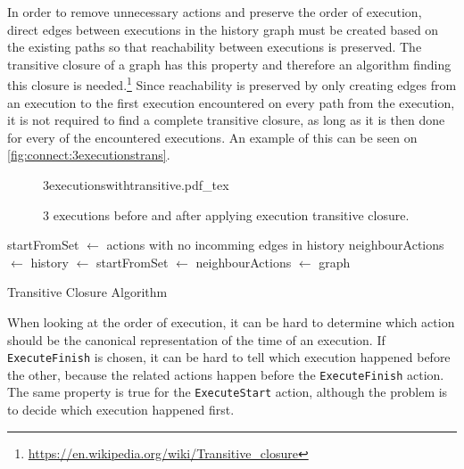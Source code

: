 	\newpar In order to remove unnecessary actions and preserve the order of execution, direct edges between executions in the history graph must be created based on the existing paths so that reachability between executions is preserved. The transitive closure of a graph has this property and therefore an algorithm finding this closure is needed.\footnote{\url{https://en.wikipedia.org/wiki/Transitive_closure}} Since reachability is preserved by only creating edges from an execution to the first execution encountered on every path from the execution, it is not required to find a complete transitive closure, as long as it is then done for every of the encountered executions. An example of this can be seen on \autoref{fig:connect:3executionstrans}.
	
	\begin{figure}
		\centering
		\def\svgwidth{0.42\columnwidth}
		\fontsize{6}{8}\selectfont
		{3executionswithtransitive.pdf_tex}
		\caption{3 executions before and after applying execution transitive closure.}
		\label{fig:connect:3executionstrans}
	\end{figure}
	
	\begin{algorithm}
		\begin{algorithmic}
			\State startFromSet $\leftarrow$ actions with no incomming edges in history
				\State neighbourActions $\leftarrow$ 
						\State history $\leftarrow$ 
						\State startFromSet $\leftarrow$ 
					\Else
						\State neighbourActions $\leftarrow$ 
					\EndIf
				\EndFor
			\EndFor
			\State 
			\Return graph
		\EndFunction
		\end{algorithmic}
		\caption{Transitive Closure Algorithm}
	\end{algorithm}

	When looking at the order of execution, it can be hard to determine which action should be the canonical representation of the time of an execution. If \texttt{ExecuteFinish} is chosen, it can be hard to tell which execution happened before the other, because the related actions happen before the \texttt{ExecuteFinish} action. The same property is true for the \texttt{ExecuteStart} action, although the problem is to decide which execution happened first.
	
